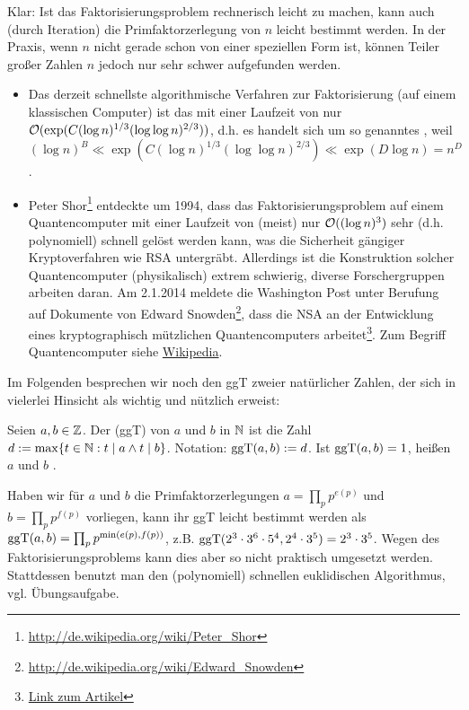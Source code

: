 Klar: Ist das Faktorisierungsproblem rechnerisch leicht zu machen, kann auch (durch Iteration) die Primfaktorzerlegung von $n$ leicht bestimmt werden. 
In der Praxis, wenn $n$ nicht gerade schon von einer speziellen Form ist, können Teiler großer Zahlen $n$ jedoch nur sehr schwer aufgefunden werden.
\begin{itemize}
	\item Das derzeit schnellste algorithmische Verfahren zur Faktorisierung (auf einem klassischen Computer) ist das  mit einer Laufzeit von nur $\mathcal{O}(\exp(C (\log n)^{1/3} (\log \log n)^{2/3}))$, d.h. es handelt sich um so genanntes , weil $(\log n)^B \ll \exp(C(\log n)^{1/3} (\log \log n)^{2/3}) \ll \exp(D \log n) = n^D$.
	\item Peter Shor\footnote{\url{http://de.wikipedia.org/wiki/Peter_Shor}} entdeckte um 1994, dass das Faktorisierungsproblem auf einem Quantencomputer mit einer Laufzeit von (meist) nur $\mathcal{O}((\log n)^3)$ sehr (d.h. polynomiell) schnell gelöst werden kann, was die Sicherheit gängiger Kryptoverfahren wie RSA untergräbt. 
	Allerdings ist die Konstruktion solcher Quantencomputer (physikalisch) extrem schwierig, diverse Forschergruppen arbeiten daran. 
	Am 2.1.2014 meldete die Washington Post unter Berufung auf Dokumente von Edward Snowden\footnote{\url{http://de.wikipedia.org/wiki/Edward_Snowden}}, dass die NSA an der Entwicklung eines kryptographisch mützlichen Quantencomputers arbeitet\footnote{\href{http://www.washingtonpost.com/world/national-security/nsa-seeks-to-build-quantum-computer-that-could-crack-most-types-of-encryption/2014/01/02/8fff297e-7195-11e3-8def-a33011492df2_story.html}{Link zum Artikel}}.
	Zum Begriff Quantencomputer siehe \href{http://de.wikipedia.org/wiki/Quantencomputer}{Wikipedia}.
\end{itemize} 

Im Folgenden besprechen wir noch den ggT zweier natürlicher Zahlen, der sich in vielerlei Hinsicht als wichtig und nützlich erweist:
\begin{defn}
	Seien $a,b \in \mathbb{Z}$. 
	Der  (ggT) von $a$ und $b$ in $\mathbb{N}$ ist die Zahl $d := \max\{t \in \mathbb{N} : t \mid a \wedge t \mid b\}$. 
	Notation: $\operatorname{ggT}(a,b) := d$. 
	Ist $\operatorname{ggT}(a,b) = 1$, heißen $a$ und $b$ . 
\end{defn}
Haben wir für $a$ und $b$ die Primfaktorzerlegungen $a = \prod_p p^{e(p)}$ und $b = \prod_p p^{f(p)}$ vorliegen, kann ihr ggT leicht bestimmt werden als $\operatorname{ggT}(a,b) = \prod_p p^{\min(e(p),f(p))}$, z.B. $\operatorname{ggT}(2^3 \cdot 3^6 \cdot 5^4, 2^4 \cdot 3^5) = 2^3 \cdot 3^5$. 
Wegen des Faktorisierungsproblems kann dies aber so nicht praktisch umgesetzt werden. 
Stattdessen benutzt man den (polynomiell) schnellen euklidischen Algorithmus, vgl. Übungsaufgabe.

